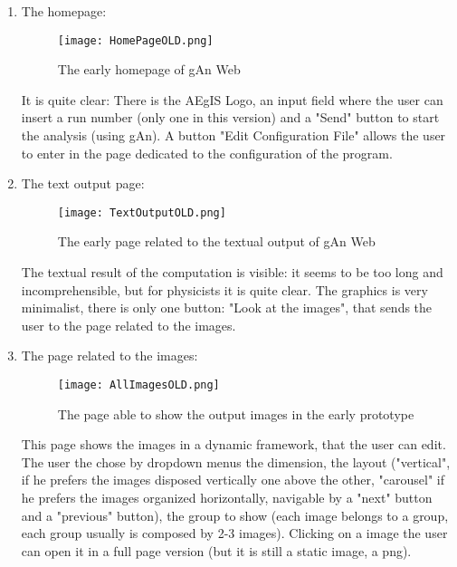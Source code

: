 \begin{enumerate}
\item The homepage:

\begin{figure}[H]
\centering
\texttt{[image: HomePageOLD.png]} 
\caption{The early homepage of gAn Web}
\end{figure}

It is quite clear: There is the AEgIS Logo, an input field where the user can insert a run number (only one in this version) and a "Send" button to start the analysis (using gAn). A button "Edit Configuration File" allows the user to  enter in the page dedicated to the configuration of the program.

\item The text output page:

\begin{figure}[H]
\centering
\texttt{[image: TextOutputOLD.png]} 
\caption{The early page related to the textual output of gAn Web}
\end{figure}
  
The textual result of the computation is visible: it seems to be too long and incomprehensible, but for physicists it is quite clear. The graphics is very minimalist, there is only one button: "Look at the images", that sends the user to the page related to the images. 



\item The page related to the images:

\begin{figure}[H]
\centering
\texttt{[image: AllImagesOLD.png]} %
\caption{The page able to show the output images in the early prototype}
\end{figure}   

This page shows the images in a dynamic framework, that the user can edit.
The user the chose by dropdown menus the dimension, the layout ("vertical", if he prefers the images disposed vertically one above the other, "carousel" if he prefers the images organized horizontally, navigable by a "next" button and a "previous" button), the group to show (each image belongs to a group, each group usually is composed by 2-3 images). Clicking on a image the user can open it in a full page version (but it is still a static image, a png).




\end{enumerate}
